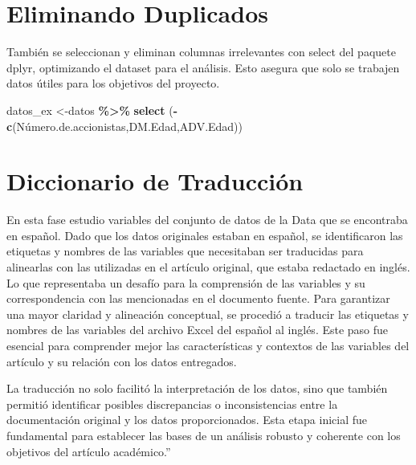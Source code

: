 \documentclass[
]{article}
\newenvironment{Shaded}{\begin{snugshade}}{\end{snugshade}}
\newcommand{\FunctionTok}[1]{\textcolor[rgb]{0.13,0.29,0.53}{\textbf{#1}}}
\newcommand{\NormalTok}[1]{#1}
\newcommand{\OtherTok}[1]{\textcolor[rgb]{0.56,0.35,0.01}{#1}}
\newcommand{\SpecialCharTok}[1]{\textcolor[rgb]{0.81,0.36,0.00}{\textbf{#1}}}
\begin{document}
\section{Eliminando Duplicados}\label{eliminando-duplicados}

También se seleccionan y eliminan columnas irrelevantes con select del
paquete dplyr, optimizando el dataset para el análisis. Esto asegura que
solo se trabajen datos útiles para los objetivos del proyecto.

\begin{Shaded}
\begin{Highlighting}[]
\NormalTok{datos\_ex }\OtherTok{\textless{}{-}}\NormalTok{datos }\SpecialCharTok{\%\textgreater{}\%} \FunctionTok{select}\NormalTok{ (}\SpecialCharTok{{-}} \FunctionTok{c}\NormalTok{(Número.de.accionistas,DM.Edad,ADV.Edad))}
\end{Highlighting}
\end{Shaded}

\section{Diccionario de Traducción}\label{diccionario-de-traducciuxf3n}

En esta fase estudio variables del conjunto de datos de la Data que se
encontraba en español. Dado que los datos originales estaban en español,
se identificaron las etiquetas y nombres de las variables que
necesitaban ser traducidas para alinearlas con las utilizadas en el
artículo original, que estaba redactado en inglés. Lo que representaba
un desafío para la comprensión de las variables y su correspondencia con
las mencionadas en el documento fuente. Para garantizar una mayor
claridad y alineación conceptual, se procedió a traducir las etiquetas y
nombres de las variables del archivo Excel del español al inglés. Este
paso fue esencial para comprender mejor las características y contextos
de las variables del artículo y su relación con los datos entregados.

La traducción no solo facilitó la interpretación de los datos, sino que
también permitió identificar posibles discrepancias o inconsistencias
entre la documentación original y los datos proporcionados. Esta etapa
inicial fue fundamental para establecer las bases de un análisis robusto
y coherente con los objetivos del artículo académico.''
\end{document}
